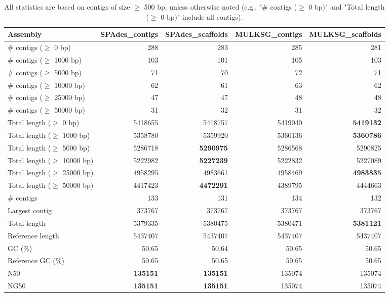 \documentclass[12pt,a4paper]{article}
\begin{document}
\begin{table}[ht]
\begin{center}
\caption{All statistics are based on contigs of size $\geq$ 500 bp, unless otherwise noted (e.g., "\# contigs ($\geq$ 0 bp)" and "Total length ($\geq$ 0 bp)" include all contigs).}
\begin{tabular}{|l*{4}{|r}|}
\hline
Assembly & SPAdes\_contigs & SPAdes\_scaffolds & MULKSG\_contigs & MULKSG\_scaffolds \\ \hline
\# contigs ($\geq$ 0 bp) & 288 & 283 & 285 & 281 \\ \hline
\# contigs ($\geq$ 1000 bp) & 103 & 101 & 105 & 103 \\ \hline
\# contigs ($\geq$ 5000 bp) & 71 & 70 & 72 & 71 \\ \hline
\# contigs ($\geq$ 10000 bp) & 62 & 61 & 63 & 62 \\ \hline
\# contigs ($\geq$ 25000 bp) & 47 & 47 & 48 & 48 \\ \hline
\# contigs ($\geq$ 50000 bp) & 31 & 32 & 31 & 32 \\ \hline
Total length ($\geq$ 0 bp) & 5418655 & 5418757 & 5419040 & {\bf 5419132} \\ \hline
Total length ($\geq$ 1000 bp) & 5358780 & 5359920 & 5360136 & {\bf 5360786} \\ \hline
Total length ($\geq$ 5000 bp) & 5286718 & {\bf 5290975} & 5286568 & 5290825 \\ \hline
Total length ($\geq$ 10000 bp) & 5222982 & {\bf 5227239} & 5222832 & 5227089 \\ \hline
Total length ($\geq$ 25000 bp) & 4958295 & 4983661 & 4958469 & {\bf 4983835} \\ \hline
Total length ($\geq$ 50000 bp) & 4417423 & {\bf 4472291} & 4389795 & 4444663 \\ \hline
\# contigs & 133 & 131 & 134 & 132 \\ \hline
Largest contig & 373767 & 373767 & 373767 & 373767 \\ \hline
Total length & 5379335 & 5380475 & 5380471 & {\bf 5381121} \\ \hline
Reference length & 5437407 & 5437407 & 5437407 & 5437407 \\ \hline
GC (\%) & 50.65 & 50.64 & 50.65 & 50.65 \\ \hline
Reference GC (\%) & 50.65 & 50.65 & 50.65 & 50.65 \\ \hline
N50 & {\bf 135151} & {\bf 135151} & 135074 & 135074 \\ \hline
NG50 & {\bf 135151} & {\bf 135151} & 135074 & 135074 \\ \hline

\end{tabular}
\end{center}
\end{table}
\end{document}
